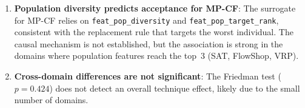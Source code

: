 \documentclass[11pt,a4paper]{article}
\begin{document}
\begin{enumerate}
  \item \textbf{Population diversity predicts acceptance for MP-CF}: The surrogate for
    MP-CF relies on \texttt{feat\_pop\_diversity} and \texttt{feat\_pop\_target\_rank},
    consistent with the replacement rule that targets the worst individual. The causal
    mechanism is not established, but the association is strong in the domains where
    population features reach the top~3 (SAT, FlowShop, VRP).

  \item \textbf{Cross-domain differences are not significant}: The Friedman test
    ($p = 0.424$) does not detect an overall technique effect, likely due to the
    small number of domains.
\end{enumerate}
\end{document}
